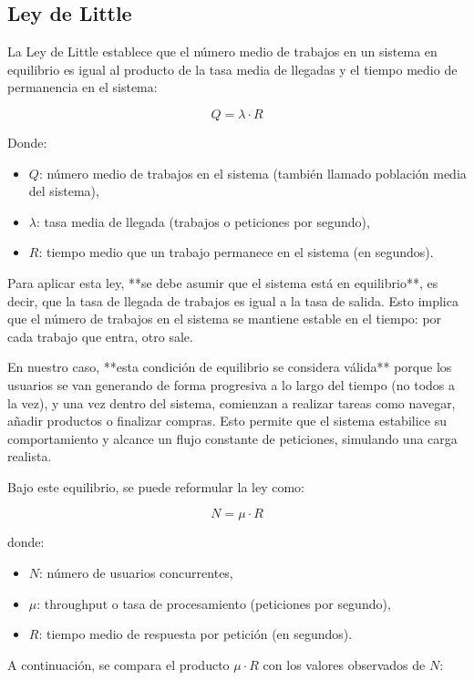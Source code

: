 \documentclass[10pt]{book}
\begin{document}
\subsection{Ley de Little}

La Ley de Little establece que el número medio de trabajos en un sistema en equilibrio es igual al producto de la tasa media de llegadas y el tiempo medio de permanencia en el sistema:

\[
Q = \lambda \cdot R
\]

Donde:

\begin{itemize}
    \item \( Q \): número medio de trabajos en el sistema (también llamado población media del sistema),
    \item \( \lambda \): tasa media de llegada (trabajos o peticiones por segundo),
    \item \( R \): tiempo medio que un trabajo permanece en el sistema (en segundos).
\end{itemize}

Para aplicar esta ley, **se debe asumir que el sistema está en equilibrio**, es decir, que la tasa de llegada de trabajos es igual a la tasa de salida. Esto implica que el número de trabajos en el sistema se mantiene estable en el tiempo: por cada trabajo que entra, otro sale.

En nuestro caso, **esta condición de equilibrio se considera válida** porque los usuarios se van generando de forma progresiva a lo largo del tiempo (no todos a la vez), y una vez dentro del sistema, comienzan a realizar tareas como navegar, añadir productos o finalizar compras. Esto permite que el sistema estabilice su comportamiento y alcance un flujo constante de peticiones, simulando una carga realista.

Bajo este equilibrio, se puede reformular la ley como:

\[
N = \mu \cdot R
\]

donde:

\begin{itemize}
    \item \(N\): número de usuarios concurrentes,
    \item \(\mu\): throughput o tasa de procesamiento (peticiones por segundo),
    \item \(R\): tiempo medio de respuesta por petición (en segundos).
\end{itemize}

A continuación, se compara el producto \(\mu \cdot R\) con los valores observados de \(N\):
\end{document}
